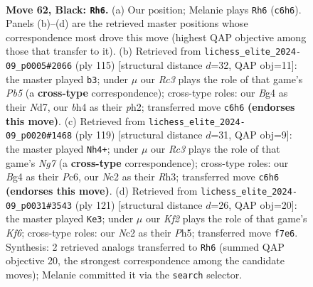 \documentclass[11pt]{article}
\begin{document}
\clearpage

\begin{figure}[p]\centering
\begin{subfigure}{0.46\textwidth}\centering
\resizebox{\linewidth}{!}{%
\newchessgame
\chessboard[
  setfen={8/5k2/2r5/1R6/r5bB/6R1/2n2P2/7K b - - 4 62},
  showmover=false,
  pgfstyle=straightmove, color=movearrow, markmove={c6-h6}
]}
\caption{}
\end{subfigure}\hfill
\begin{subfigure}{0.46\textwidth}\centering
\resizebox{\linewidth}{!}{%
\newchessgame
\chessboard[
  setfen={2k5/3n1R2/8/3r4/1p4R1/8/7P/2K5 b - - 0 58},
  showmover=false,
  pgfstyle=straightmove, color=movearrow, markmove={b4-b3}
]}
\caption{}
\end{subfigure}
\\[4pt]
\begin{subfigure}{0.46\textwidth}\centering
\resizebox{\linewidth}{!}{%
\newchessgame
\chessboard[
  setfen={6k1/2R5/2pB2K1/8/6P1/7r/6n1/8 b - - 9 60},
  showmover=false,
  pgfstyle=straightmove, color=movearrow, markmove={g2-h4}
]}
\caption{}
\end{subfigure}\hfill
\begin{subfigure}{0.46\textwidth}\centering
\resizebox{\linewidth}{!}{%
\newchessgame
\chessboard[
  setfen={8/8/8/2r4p/7P/3B1k2/8/1Rb2K2 b - - 20 61},
  showmover=false,
  pgfstyle=straightmove, color=movearrow, markmove={f3-e3}
]}
\caption{}
\end{subfigure}
\caption{\textbf{Move 62, Black: \texttt{Rh6}.} (a) Our position; Melanie plays \texttt{Rh6} (\texttt{c6h6}). Panels (b)--(d) are the retrieved master positions whose correspondence most drove this move (highest QAP objective among those that transfer to it). (b) Retrieved from \texttt{lichess\_elite\_2024-09\_p0005\#2066} (ply 115) [structural distance $d$=32, QAP obj=11]: the master played \texttt{b3}; under $\mu$ our \emph{Rc3} plays the role of that game's \emph{Pb5} (a \textbf{cross-type} correspondence); cross-type roles: our \emph{B}g4 as their \emph{N}d7, our \emph{b}h4 as their \emph{p}h2; transferred move \texttt{c6h6} \textbf{(endorses this move)}. (c) Retrieved from \texttt{lichess\_elite\_2024-09\_p0020\#1468} (ply 119) [structural distance $d$=31, QAP obj=9]: the master played \texttt{Nh4+}; under $\mu$ our \emph{Rc3} plays the role of that game's \emph{Ng7} (a \textbf{cross-type} correspondence); cross-type roles: our \emph{B}g4 as their \emph{P}c6, our \emph{N}c2 as their \emph{R}h3; transferred move \texttt{c6h6} \textbf{(endorses this move)}. (d) Retrieved from \texttt{lichess\_elite\_2024-09\_p0031\#3543} (ply 121) [structural distance $d$=26, QAP obj=20]: the master played \texttt{Ke3}; under $\mu$ our \emph{Kf2} plays the role of that game's \emph{Kf6}; cross-type roles: our \emph{N}c2 as their \emph{P}h5; transferred move \texttt{f7e6}. Synthesis: 2 retrieved analogs transferred to \texttt{Rh6} (summed QAP objective 20, the strongest correspondence among the candidate moves); Melanie committed it via the \texttt{search} selector.}
\label{fig:thought-m123}
\end{figure}
\end{document}

